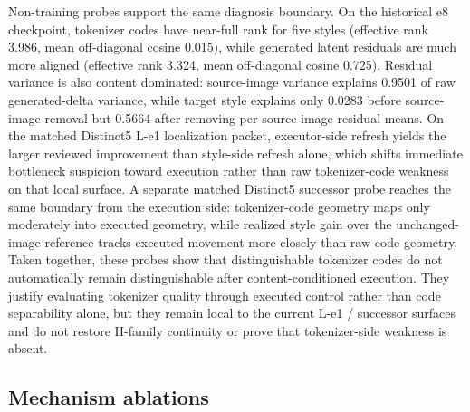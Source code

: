 \documentclass[letterpaper]{article}
\begin{document}
Non-training probes support the same diagnosis boundary. On the historical e8 checkpoint, tokenizer codes have near-full rank for five styles (effective rank 3.986, mean off-diagonal cosine 0.015), while generated latent residuals are much more aligned (effective rank 3.324, mean off-diagonal cosine 0.725). Residual variance is also content dominated: source-image variance explains 0.9501 of raw generated-delta variance, while target style explains only 0.0283 before source-image removal but 0.5664 after removing per-source-image residual means. On the matched Distinct5 L-e1 localization packet, executor-side refresh yields the larger reviewed improvement than style-side refresh alone, which shifts immediate bottleneck suspicion toward execution rather than raw tokenizer-code weakness on that local surface. A separate matched Distinct5 successor probe reaches the same boundary from the execution side: tokenizer-code geometry maps only moderately into executed geometry, while realized style gain over the unchanged-image reference tracks executed movement more closely than raw code geometry. Taken together, these probes show that distinguishable tokenizer codes do not automatically remain distinguishable after content-conditioned execution. They justify evaluating tokenizer quality through executed control rather than code separability alone, but they remain local to the current L-e1 / successor surfaces and do not restore H-family continuity or prove that tokenizer-side weakness is absent.

\subsection{Mechanism ablations}
\begin{table}[t]
\centering
\caption{Destructive ablations under the historical strict-750 protocol.}
\label{tab:ablation}
\small
{}
\end{table}
\end{document}
